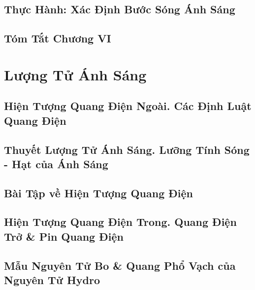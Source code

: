 \documentclass{article}
\numberwithin{equation}{section}
\begin{document}
\subsection{Thực Hành: Xác Định Bước Sóng Ánh Sáng}


\subsection{Tóm Tắt Chương VI}


\section{Lượng Tử Ánh Sáng}

\subsection{Hiện Tượng Quang Điện Ngoài. Các Định Luật Quang Điện}


\subsection{Thuyết Lượng Tử Ánh Sáng. Lưỡng Tính Sóng - Hạt của Ánh Sáng}


\subsection{Bài Tập về Hiện Tượng Quang Điện}


\subsection{Hiện Tượng Quang Điện Trong. Quang Điện Trở \& Pin Quang Điện}


\subsection{Mẫu Nguyên Tử Bo \& Quang Phổ Vạch của Nguyên Tử Hydro}
\end{document}
